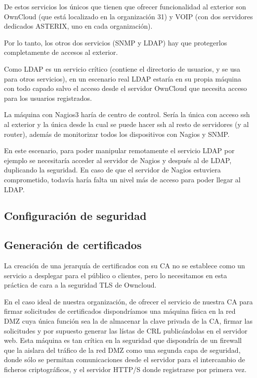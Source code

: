 \documentclass[]{article}
\begin{document}
De estos servicios los únicos que tienen que ofrecer funcionalidad al exterior son OwnCloud (que está localizado en la organización 31) y VOIP (con dos servidores dedicados ASTERIX, uno en cada organización).

Por lo tanto, los otros dos servicios (SNMP y LDAP) hay que protegerlos completamente de accesos al exterior. 

Como LDAP es un servicio crítico (contiene el directorio de usuarios, y se usa para otros servicios), en un escenario real LDAP estaría en su propia máquina con todo capado salvo el acceso desde el servidor OwnCloud que necesita acceso para los usuarios registrados.

La máquina con Nagios3 haría de centro de control. Sería la única con acceso ssh al exterior y la única desde la cual se puede hacer ssh al resto de servidores (y al router), además de monitorizar todos los dispositivos con Nagios y SNMP.

En este escenario, para poder manipular remotamente el servicio LDAP por ejemplo se necesitaría acceder al servidor de Nagios y después al de LDAP, duplicando la seguridad. En caso de que el servidor de Nagios estuviera comprometido, todavía haría falta un nivel más de acceso para poder llegar al LDAP.




\subsection{Configuración de seguridad}

\subsection{Generación de certificados}

La creación de una jerarquía de certificados con su CA no se establece como un servicio a desplegar para el público o clientes, pero lo necesitamos en esta práctica de cara a la seguridad TLS de Owncloud.

En el caso ideal de nuestra organización, de ofrecer el servicio de nuestra CA para firmar solicitudes de certificados dispondríamos una máquina física en la red DMZ cuya única función sea la de almacenar la clave privada de la CA, firmar las solicitudes y por supuesto generar las lístas de CRL publicándolas en el servidor web. Esta máquina es tan crítica en la seguridad que dispondría de un firewall que la aislara del tráfico de la red DMZ como una segunda capa de seguridad, donde sólo se permitan comunicaciones desde el servidor para el intercambio de ficheros criptográficos, y el servidor HTTP/S donde registrarse por primera vez.
\end{document}

